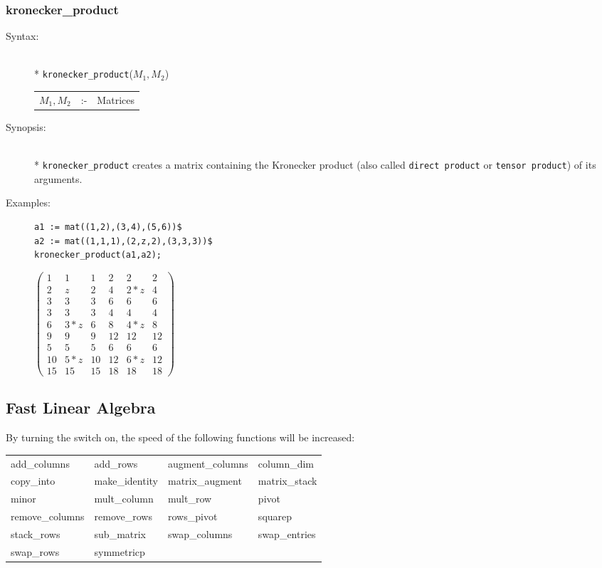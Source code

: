 \subsubsection{kronecker\_product}
\label{linalg:kronecker_product}
\begin{description}
\item[Syntax:]\mbox{}\\*
\texttt{kronecker\_product}($M_1,M_2$)\\[2mm]
\begin{tabular}{l l l}
$M_1,M_2$ &:-& Matrices
\end{tabular}

\item[Synopsis:]\mbox{}\\*
\texttt{kronecker\_product} creates a matrix containing the Kronecker product
(also called \texttt{direct product} or \texttt{tensor product}) of its arguments.

\item[Examples:]
\begin{verbatim}
a1 := mat((1,2),(3,4),(5,6))$
a2 := mat((1,1,1),(2,z,2),(3,3,3))$
kronecker_product(a1,a2);
\end{verbatim}
\begin{flushleft}
\(
\begin{pmatrix} 1 & 1 & 1 & 2 & 2 & 2 \\
2 &  z & 2 & 4  &2*z &4 \\
3 &  3 & 3 & 6  & 6  &6 \\
3 &  3 & 3 & 4  & 4  &4 \\
6 & 3*z& 6 & 8  &4*z &8 \\
9 &  9 & 9 & 12 &12  &12\\
5 &  5 & 5 & 6  & 6  &6 \\
10 &5*z& 10& 12 &6*z &12 \\
15 &15 & 15& 18 &18  &18
\end{pmatrix}
\)
\end{flushleft}
\end{description}

\subsection{Fast Linear Algebra}

By turning the  switch on, the speed of the following
functions will be increased:

\begin{tabular}{l l l l}
   add\_columns    & add\_rows      & augment\_columns & column\_dim  \\
   copy\_into      & make\_identity & matrix\_augment  & matrix\_stack\\
   minor           & mult\_column   &  mult\_row       & pivot        \\
   remove\_columns & remove\_rows   & rows\_pivot      & squarep      \\
   stack\_rows     & sub\_matrix    & swap\_columns    & swap\_entries\\
   swap\_rows      & symmetricp
\end{tabular}

